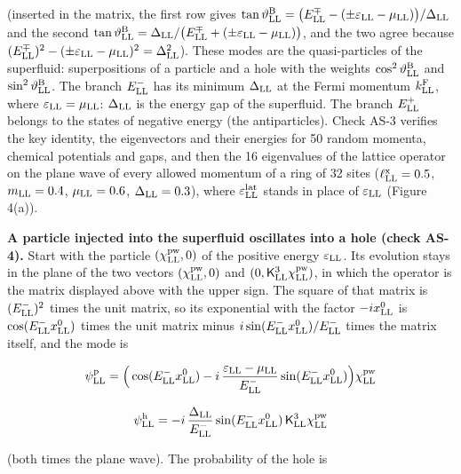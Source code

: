 \documentclass[
  10pt,
]{article}
\begin{document}
(inserted in the matrix, the first row gives
\(\tan\vartheta^{\rm B}_{\rm LL}=\big(E^\mp_{\rm LL}-(\pm\varepsilon_{\rm LL}-\mu_{\rm LL})\big)/\Delta_{\rm LL}\)
and the second
\(\tan\vartheta^{\rm B}_{\rm LL}=\Delta_{\rm LL}/\big(E^\mp_{\rm LL}+(\pm\varepsilon_{\rm LL}-\mu_{\rm LL})\big)\),
and the two agree because
\((E^\mp_{\rm LL})^2-(\pm\varepsilon_{\rm LL}-\mu_{\rm LL})^2=\Delta_{\rm LL}^2\)).
These modes are the quasi-particles of the superfluid: superpositions of
a particle and a hole with the weights
\(\cos^2\vartheta^{\rm B}_{\rm LL}\) and
\(\sin^2\vartheta^{\rm B}_{\rm LL}\). The branch \(E^-_{\rm LL}\) has
its minimum \(\Delta_{\rm LL}\) at the Fermi momentum
\(k^{\rm F}_{\rm LL}\), where \(\varepsilon_{\rm LL}=\mu_{\rm LL}\):
\(\Delta_{\rm LL}\) is the energy gap of the superfluid. The branch
\(E^+_{\rm LL}\) belongs to the states of negative energy (the
antiparticles). Check AS-3 verifies the key identity, the eigenvectors
and their energies for 50 random momenta, chemical potentials and gaps,
and then the 16 eigenvalues of the lattice operator on the plane wave of
every allowed momentum of a ring of 32 sites
(\(\ell^{\rm x}_{\rm LL}=0.5\), \(m_{\rm LL}=0.4\),
\(\mu_{\rm LL}=0.6\), \(\Delta_{\rm LL}=0.3\)), where
\(\varepsilon^{\rm lat}_{\rm LL}\) stands in place of
\(\varepsilon_{\rm LL}\) (Figure 4(a)).

\textbf{A particle injected into the superfluid oscillates into a hole
(check AS-4).} Start with the particle \((\chi^{\rm pw}_{\rm LL},0)\) of
the positive energy \(\varepsilon_{\rm LL}\). Its evolution stays in the
plane of the two vectors \((\chi^{\rm pw}_{\rm LL},0)\) and
\((0,\mathsf K^3_{\rm LL}\chi^{\rm pw}_{\rm LL})\), in which the
operator is the matrix displayed above with the upper sign. The square
of that matrix is \((E^-_{\rm LL})^2\) times the unit matrix, so its
exponential with the factor \(-ix^0_{\rm LL}\) is
\(\cos(E^-_{\rm LL}x^0_{\rm LL})\) times the unit matrix minus
\(i\sin(E^-_{\rm LL}x^0_{\rm LL})/E^-_{\rm LL}\) times the matrix
itself, and the mode is

\[\psi^{\rm p}_{\rm LL}=\Big(\cos(E^-_{\rm LL}x^0_{\rm LL})-i\,\frac{\varepsilon_{\rm LL}-\mu_{\rm LL}}{E^-_{\rm LL}}\sin(E^-_{\rm LL}x^0_{\rm LL})\Big)\chi^{\rm pw}_{\rm LL}\]

\[\psi^{\rm h}_{\rm LL}=-i\,\frac{\Delta_{\rm LL}}{E^-_{\rm LL}}\sin(E^-_{\rm LL}x^0_{\rm LL})\,\mathsf K^3_{\rm LL}\chi^{\rm pw}_{\rm LL}\]

(both times the plane wave). The probability of the hole is
\end{document}
